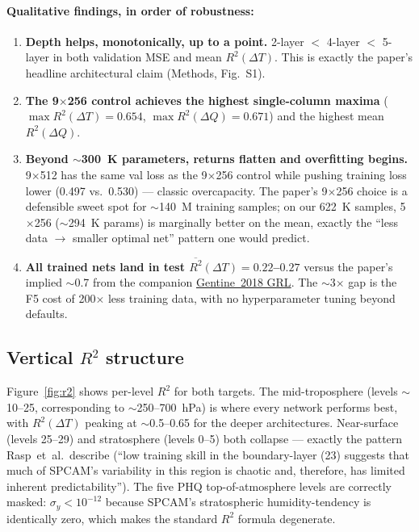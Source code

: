 \documentclass[11pt]{article}
\begin{document}
\paragraph{Qualitative findings, in order of robustness:}
\begin{enumerate}
\item \textbf{Depth helps, monotonically, up to a point.} 2-layer $<$
  4-layer $<$ 5-layer in both validation MSE and mean $R^2(\Delta T)$.
  This is exactly the paper's headline architectural claim
  (Methods, Fig.~S1).
\item \textbf{The 9$\times$256 control achieves the highest single-column
  maxima} ($\max R^2(\Delta T)=0.654$, $\max R^2(\Delta Q)=0.671$) and the
  highest mean $R^2(\Delta Q)$.
\item \textbf{Beyond $\sim$300~K parameters, returns flatten and
  overfitting begins.} 9$\times$512 has the same val loss as the 9$\times$256
  control while pushing training loss lower (0.497 vs.\ 0.530) --- classic
  overcapacity. The paper's 9$\times$256 choice is a defensible sweet spot
  for $\sim$140~M training samples; on our 622~K samples, 5$\times$256
  ($\sim$294~K params) is marginally better on the mean, exactly the
  ``less data $\to$ smaller optimal net'' pattern one would predict.
\item \textbf{All trained nets land in test $\overline{R^2}(\Delta T) =
  0.22$--$0.27$} versus the paper's implied $\sim$0.7 from the companion
  \href{https://doi.org/10.1029/2018GL078202}{Gentine~2018 GRL}. The
  $\sim$3$\times$ gap is the F5 cost of 200$\times$ less training data, with
  no hyperparameter tuning beyond defaults.
\end{enumerate}

\subsection{Vertical $R^2$ structure}

Figure~\ref{fig:r2} shows per-level $R^2$ for both targets. The mid-troposphere
(levels $\sim$10--25, corresponding to $\sim$250--700~hPa) is where every
network performs best, with $R^2(\Delta T)$ peaking at $\sim$0.5--0.65 for
the deeper architectures. Near-surface (levels 25--29) and stratosphere
(levels 0--5) both collapse --- exactly the pattern Rasp~et~al.\ describe
(``low training skill in the boundary-layer (23) suggests that much of
SPCAM's variability in this region is chaotic and, therefore, has limited
inherent predictability''). The five PHQ top-of-atmosphere levels are
correctly masked: $\sigma_y < 10^{-12}$ because SPCAM's stratospheric
humidity-tendency is identically zero, which makes the standard $R^2$
formula degenerate.
\end{document}
